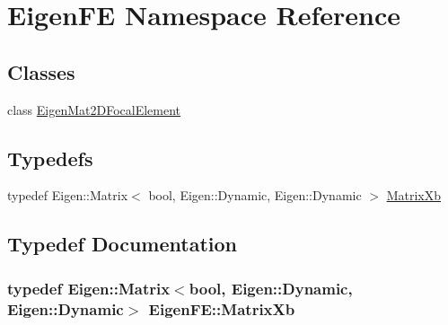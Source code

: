 \hypertarget{namespaceEigenFE}{}\section{Eigen\+F\+E Namespace Reference}
\label{namespaceEigenFE}
\subsection*{Classes}
\begin{DoxyCompactItemize}
\item 
class \hyperlink{classEigenFE_1_1EigenMat2DFocalElement}{Eigen\+Mat2\+D\+Focal\+Element}
\end{DoxyCompactItemize}
\subsection*{Typedefs}
\begin{DoxyCompactItemize}
\item 
typedef Eigen\+::\+Matrix$<$ bool, Eigen\+::\+Dynamic, Eigen\+::\+Dynamic $>$ \hyperlink{namespaceEigenFE_a478c1c0c93aef88b798e7c38a9c65d59}{Matrix\+Xb}
\end{DoxyCompactItemize}


\subsection{Typedef Documentation}
\hypertarget{namespaceEigenFE_a478c1c0c93aef88b798e7c38a9c65d59}{}
\subsubsection[{Matrix\+Xb}]{\setlength{\rightskip}{0pt plus 5cm}typedef Eigen\+::\+Matrix$<$bool, Eigen\+::\+Dynamic, Eigen\+::\+Dynamic$>$ {\bf Eigen\+F\+E\+::\+Matrix\+Xb}}\label{namespaceEigenFE_a478c1c0c93aef88b798e7c38a9c65d59}
